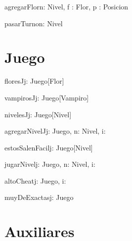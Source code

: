 \documentclass[spanish,a4paper]{article}
\begin{document}
\begin{problema}{agregarFlor}{n: Nivel, f : Flor, p : Posicion}{}
\end{problema}

\noindent{}

\begin{problema}{pasarTurno}{n: Nivel}{}
\end{problema}




\section{Juego}


\begin{problema}{floresJ}{j: Juego}{[Flor]}
\end{problema}

\begin{problema}{vampirosJ}{j: Juego}{[Vampiro]}
\end{problema}

\begin{problema}{nivelesJ}{j: Juego}{[Nivel]}
\end{problema}

\begin{problema}{agregarNivelJ}{j: Juego, n: Nivel, i: \ent}{}
\end{problema}

\begin{problema}{estosSalenFacil}{j: Juego}{[Nivel]}
\end{problema}

\begin{problema}{jugarNivel}{j: Juego, n: Nivel, i: \ent}{}
\end{problema}

\begin{problema}{altoCheat}{j: Juego, i: \ent}{}
\end{problema}

\begin{problema}{muyDeExactas}{j: Juego}{\bool}
\end{problema}

\section{Auxiliares}
\end{document}
